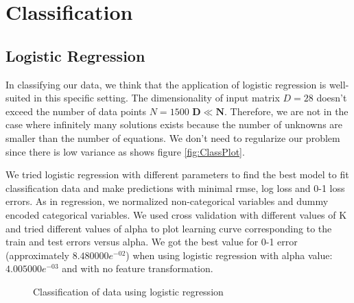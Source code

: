 \documentclass{article} %
\begin{document}
\section{Classification}

\subsection{Logistic Regression}

In classifying our data, we think that the application of logistic regression is well-suited in this specific setting. The dimensionality of input matrix $D= 28$ doesn't exceed the number of data points $N = 1500$ $\mathbf{D\ll N}$. Therefore, we are not in the case where infinitely many solutions exists because the number of unknowns are smaller than the number of equations. We don't need to regularize our problem since there is low variance as shows figure \ref{fig:ClassPlot}.

We tried logistic regression with different parameters to find the best model to fit classification data and make predictions with minimal rmse, log loss and 0-1 loss errors. As in regression, we normalized non-categorical variables and dummy encoded categorical variables. We used cross validation with different values of K and tried different values of alpha to plot learning curve corresponding to the train and test errors versus alpha. We got the best value for 0-1 error (approximately $8.480000e^{-02}$) when using logistic regression with alpha value: $4.005000e^{-03}$ and with no feature transformation. 

\begin{figure}[!h]
\center
{}
\caption{Classification of data using logistic regression}
\end{figure}
\end{document}
